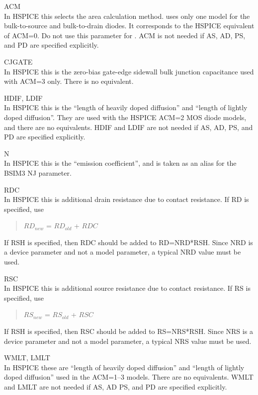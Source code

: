 \begin{description}
\item{\vt ACM}\\
 In HSPICE this selects the area calculation method.  {\WRspice} uses
 only one model for the bulk-to-source and bulk-to-drain diodes.  It
 corresponds to the HSPICE equivalent of {\vt ACM}=0.  Do not use this
 parameter for {\WRspice}.  {\vt ACM} is not needed if {\vt AS}, {\vt
 AD}, {\vt PS}, and {\vt PD} are specified explicitly.
\item{\vt CJGATE}\\
 In HSPICE this is the zero-bias gate-edge sidewall bulk junction
 capacitance used with {\vt ACM}=3 only.  There is no {\WRspice}
 equivalent.
\item{{\vt HDIF}, {\vt LDIF}}\\
 In HSPICE this is the ``length of heavily doped diffusion'' and
 ``length of lightly doped diffusion''.  They are used with the HSPICE
 {\vt ACM}=2 MOS diode models, and there are no {\WRspice} equivalents. 
 {\vt HDIF} and {\vt LDIF} are not needed if {\vt AS}, {\vt AD}, {\vt
 PS}, and {\vt PD} are specified explicitly.
\item{\vt N}\\
 In HSPICE this is the ``emission coefficient'', and is taken as an
 alias for the BSIM3 {\vt NJ} parameter.
\item{\vt RDC}\\
 In HSPICE this is additional drain resistance due to contact
 resistance.  If {\vt RD} is specified, use
\begin{quote}
 $RD_{new}$ = $RD_{old}$ + $RDC$
\end{quote}
 If {\vt RSH} is specified, then {\vt RDC} should be added to {\vt
 RD}={\vt NRD}*{\vt RSH}.  Since {\vt NRD} is a device parameter and
 not a model parameter, a typical {\vt NRD} value must be used.
\item{\vt RSC}\\
 In HSPICE this is additional source resistance due to contact
 resistance.  If {\vt RS} is specified, use
\begin{quote}
 $RS_{new}$ = $RS_{old}$ + $RSC$
\end{quote}
 If {\vt RSH} is specified, then {\vt RSC} should be added to {\vt
 RS}={\vt NRS}*{\vt RSH}.  Since {\vt NRS} is a device parameter and
 not a model parameter, a typical {\vt NRS} value must be used.
\item{{\vt WMLT}, {\vt LMLT}}\\
 In HSPICE these are ``length of heavily doped diffusion'' and ``length
 of lightly doped diffusion'' used in the {\vt ACM}=1--3 models.  There
 are no {\WRspice} equivalents.  {\vt WMLT} and {\vt LMLT} are not
 needed if {\vt AS}, {\vt AD} {\vt PS}, and {\vt PD} are specified
 explicitly.
\end{description}

